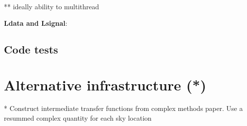 \documentclass[twocolumn,prd,nofootinbib]{revtex4}
\begin{document}
** ideally ability to multithread


\noindent \textbf{Ldata and Lsignal}: 



\subsection{Code tests}





\section{Alternative infrastructure (*)}

* Construct intermediate transfer functions from complex methods paper.  Use a resummed complex quantity for each sky location



\end{document}
